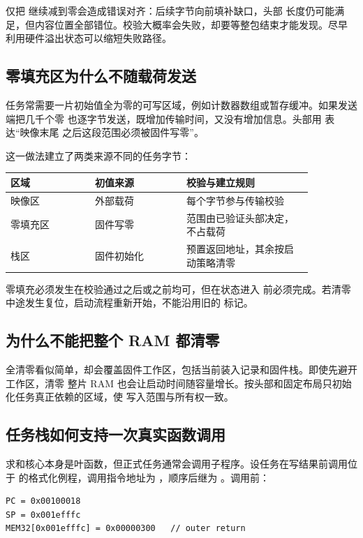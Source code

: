 仅把  继续减到零会造成错误对齐：后续字节向前填补缺口，头部
长度仍可能满足，但内容位置全部错位。校验大概率会失败，却要等整包结束才能发现。尽早
利用硬件溢出状态可以缩短失败路径。

\subsection{零填充区为什么不随载荷发送}

任务常需要一片初始值全为零的可写区域，例如计数器数组或暂存缓冲。如果发送端把几千个零
也逐字节发送，既增加传输时间，又没有增加信息。头部用  表达“映像末尾
之后这段范围必须被固件写零”。

这一做法建立了两类来源不同的任务字节：

\begin{longtable}{|L{0.24\linewidth}|L{0.26\linewidth}|L{0.36\linewidth}|}
\hline
区域 & 初值来源 & 校验与建立规则 \\ \hline
映像区 & 外部载荷 & 每个字节参与传输校验 \\ \hline
零填充区 & 固件写零 & 范围由已验证头部决定，不占载荷 \\ \hline
栈区 & 固件初始化 & 预置返回地址，其余按启动策略清零 \\ \hline
\end{longtable}

零填充必须发生在校验通过之后或之前均可，但在状态进入  前必须完成。若清零
中途发生复位，启动流程重新开始，不能沿用旧的  标记。

\subsection{为什么不能把整个 RAM 都清零}

全清零看似简单，却会覆盖固件工作区，包括当前装入记录和固件栈。即使先避开工作区，清零
整片 RAM 也会让启动时间随容量增长。按头部和固定布局只初始化任务真正依赖的区域，使
写入范围与所有权一致。

\subsection{任务栈如何支持一次真实函数调用}

求和核心本身是叶函数，但正式任务通常会调用子程序。设任务在写结果前调用位于
 的格式化例程，调用指令地址为 ，顺序后继为
。调用前：

\begin{lstlisting}
PC = 0x00100018
SP = 0x001efffc
MEM32[0x001efffc] = 0x00000300   // outer return
\end{lstlisting}

